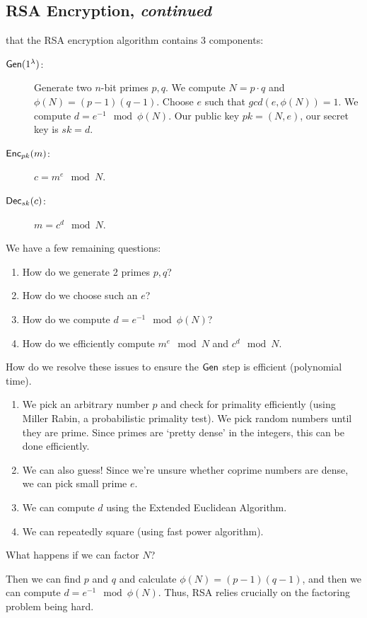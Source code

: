 \subsection{RSA Encryption, \emph{continued}}
\recall that the RSA encryption algorithm contains 3 components:
\begin{description}
    \item[$\operatorname{\mathsf{Gen}}(1^\lambda)$:] Generate two $n$-bit primes $p, q$. We compute $N = p\cdot q$ and $\phi(N) = (p-1)(q-1)$. Choose $e$ such that $gcd(e, \phi(N)) = 1$. We compute $d = e^{-1}\mod{\phi(N)}$. Our public key $pk = (N, e)$, our secret key is $sk = d$.
    \item[$\operatorname{\mathsf{Enc}}_{pk}(m)$:] $c = m^e\mod{N}$.
    \item[$\operatorname{\mathsf{Dec}}_{sk}(c)$:] $m = c^d\mod{N}$.
\end{description}
We have a few remaining questions:
\begin{enumerate}
    \item How do we generate 2 primes $p, q$?
    \item How do we choose such an $e$?
    \item How do we compute $d = e^{-1}\mod{\phi(N)}$?
    \item How do we efficiently compute $m^e\mod{N}$ and $c^d\mod N$.
\end{enumerate}
How do we resolve these issues to ensure the $\operatorname{\mathsf{Gen}}$ step is efficient (polynomial time).
\begin{enumerate}
    \item We pick an arbitrary number $p$ and check for primality efficiently (using Miller Rabin, a probabilistic primality test). We pick random numbers until they are prime. Since primes are `pretty dense' in the integers, this can be done efficiently.
    \item We can also guess! Since we're unsure whether coprime numbers are dense, we can pick small prime $e$.
    \item We can compute $d$ using the Extended Euclidean Algorithm.
    \item We can repeatedly square (using fast power algorithm).
\end{enumerate}

\begin{ques*}
    What happens if we can factor $N$?
\end{ques*}

Then we can find $p$ and $q$ and calculate $\phi(N) = (p-1)(q-1)$, and then we can compute $d = e^{-1}\mod{\phi(N)}$. Thus, RSA relies crucially on the factoring problem being hard.
    

